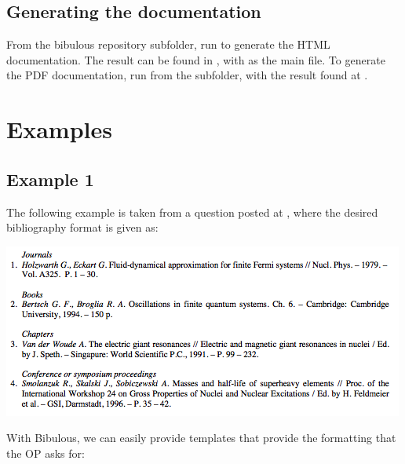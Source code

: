 \documentclass[letterpaper,10pt,english]{sphinxmanual}
\begin{document}
\section{Generating the documentation}
\label{developer_guide:generating-the-documentation}
From the bibulous repository  subfolder, run  to generate the HTML documentation. The result can be found in , with  as the main file. To generate the PDF documentation, run  from the  subfolder, with the result found at .


\chapter{Examples}
\label{examples::doc}\label{examples:examples}

\section{Example 1}
\label{examples:example-1}
The following example is taken from a question posted at , where the desired bibliography format is given as:

\includegraphics[width=0.500\linewidth]{example1a.png}

With Bibulous, we can easily provide templates that provide the formatting that the OP asks for:
\end{document}
